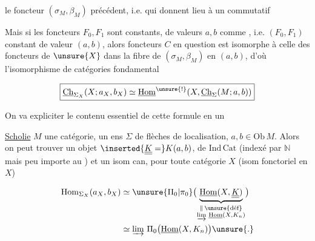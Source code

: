 
le foncteur $(\sigma_M,\beta_M)$ précédent, i.e. qui donnent lieu à un   commutatif 


Mais si les foncteurs $F_0,F_1$ sont constants, de valeurs $a,b$ comme , i.e. $(F_0,F_1)$ constant de valeur $(a,b)$, alors   foncteurs $C$ en question est  isomorphe à celle des foncteurs de $\unsure{X}$ dans la fibre de $(\sigma_M,\beta_M)$ en $(a,b)$, d'où l'isomorphisme de catégories fondamental

\[
\boxed{\underline{\mathrm{Ch}}_{\Sigma_X}(X;a_X,b_X)\simeq
 \underline{\mathrm{Hom}}^{\unsure{!}}(X,\underline{\mathrm{Ch}}_{\Sigma}(M;a,b))}
\]

On va expliciter le contenu essentiel de cette formule en un

\uline{Scholie}  $M$ une catégorie,  un ens $\Sigma$ de flèches de localisation, $a,b\in\mathrm{Ob}\,M$. Alors on peut trouver un  objet $\inserted{\underline{\underline K}=}K(a,b)$,  de $\mathrm{Ind}\,\mathrm{Cat}$ (indexé par $\mathbb N$ mais peu importe au ) et un isom can, pour toute catégorie $X$ (isom fonctoriel en $X$)

\[
\begin{aligned}
\mathrm{Hom}_{\Sigma_X}(a_X,b_X)&\simeq
 \unsure{\Pi_0|\pi_0}\bigl(\underbrace{\underline{\mathrm{Hom}}(X,\underline{\underline K})}_{\substack{\Vert\,\unsure{\text{déf}}\\ \varinjlim\,\underline{\mathrm{Hom}}(X,K_n)}}\bigr)\\
 &\simeq\varinjlim\,\Pi_0\bigl(\underline{\mathrm{Hom}}(X,K_n)\bigr)\unsure{.}
\end{aligned}
\]

